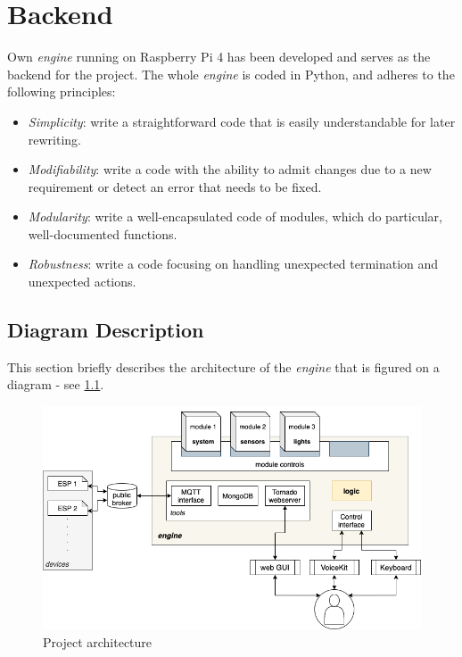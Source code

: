\chapter{Backend} \label{chap:backend}



Own \textit{engine} running on Raspberry Pi 4 has been developed and serves as the backend for the project. The whole \textit{engine} is coded in Python, and adheres to the following principles:
\begin{itemize}
	\item \textit{Simplicity}: write a straightforward code that is easily understandable for later rewriting.
	\item \textit{Modifiability}: write a code with the ability to admit changes due to a new requirement or detect an error that needs to be fixed.
	\item \textit{Modularity}: write a well-encapsulated code of modules, which do particular, well-documented functions.
	\item \textit{Robustness}: write a code focusing on handling unexpected termination and unexpected actions.
\end{itemize}


\section{Diagram Description} \label{section:diagram description}

This section briefly describes the architecture of the \textit{engine} that is figured on a diagram - see  \cref{fig:vh_project_design}.

\begin{figure}[H]
  \centering
  \includegraphics[width=\textwidth]{img/vh_project_design.png}
  \caption{Project architecture}
  \label{fig:vh_project_design}
\end{figure}

